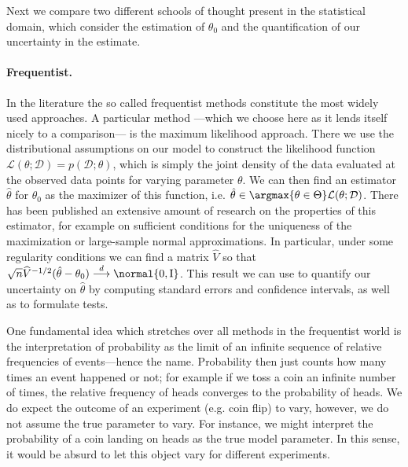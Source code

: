 Next we compare two different schools of thought present in the statistical domain, which consider the estimation of $\theta_0$ and the quantification of our uncertainty in the estimate.

\paragraph{Frequentist.}
In the literature the so called frequentist methods constitute the most widely used approaches.
A particular method ---which we choose here as it lends itself nicely to a comparison--- is the maximum likelihood approach.
There we use the distributional assumptions on our model to construct the likelihood function $\mathcal{L}(\theta; \mathcal{D}) = p(\mathcal{D}; \theta)$, which is simply the joint density of the data evaluated at the observed data points for varying parameter $\theta$.
We can then find an estimator $\hat{\theta}$ for $\theta_0$ as the maximizer of this function, i.e. $\hat{\theta} \in \argmax{\theta \in \Theta} \mathcal{L}(\theta; \mathcal{D})$.
There has been published an extensive amount of research on the properties of this estimator, for example on sufficient conditions for the uniqueness of the maximization or large-sample normal approximations.
In particular, under some regularity conditions we can find a matrix $\widehat{V}$ so that $\sqrt{n}\widehat{V}^{-1/2}(\hat{\theta} - \theta_0) \overset{d}{\longrightarrow} \normal{0, \mathrm{I}}$.
This result we can use to quantify our uncertainty on $\hat{\theta}$ by computing standard errors and confidence intervals, as well as to formulate tests.

One fundamental idea which stretches over all methods in the frequentist world is the interpretation of probability as the limit of an infinite sequence of relative frequencies of events---hence the name.
Probability then just counts how many times an event happened or not; for example if we toss a coin an infinite number of times, the relative frequency of heads converges to the probability of heads.
We do expect the outcome of an experiment (e.g. coin flip) to vary, however, we do not assume the true parameter to vary.
For instance, we might interpret the probability of a coin landing on heads as the true model parameter.
In this sense, it would be absurd to let this object vary for different experiments.

